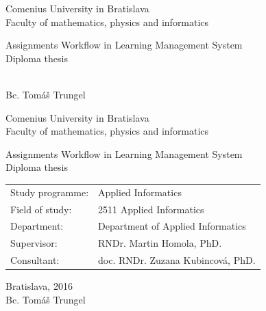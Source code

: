 \documentclass[12pt, oneside]{book}
\def\mfrok{2016}
\def\mfnazov{Assignments Workflow in Learning Management System}
\def\mftyp{Diploma thesis}
\def\mfautor{Bc. Tomáš Trungel}
\def\mfskolitel{RNDr. Martin Homola, PhD.}
\def\mfkonzultant{doc. RNDr. Zuzana Kubincová, PhD.}
\def\mfmiesto{Bratislava, \mfrok}
\def\mfodbor{2511 Applied Informatics}
\def\program{ Applied Informatics }
\def\mfpracovisko{ Department of Applied Informatics }
\begin{document}
     

\thispagestyle{empty}

\begin{center}
\sc\large
Comenius University in Bratislava\\
Faculty of mathematics, physics and informatics

\vfill

{\LARGE\mfnazov}\\
\mftyp
\end{center}

\vfill

{\sc\large 
\noindent \mfrok\\
\mfautor
}

\eject %


\thispagestyle{empty}
\noindent

\begin{center}
\sc  
\large
Comenius University in Bratislava\\
Faculty of mathematics, physics and informatics

\vfill

{\LARGE\mfnazov}\\
\mftyp
\end{center}

\vfill

\noindent
\begin{tabular}{ll}
Study programme: & \program \\
Field of study: & \mfodbor \\
Department: & \mfpracovisko \\
Supervisor: & \mfskolitel \\
Consultant: & \mfkonzultant \\
\end{tabular}

\vfill


\noindent \mfmiesto\\
\mfautor

\eject %




\end{document}
